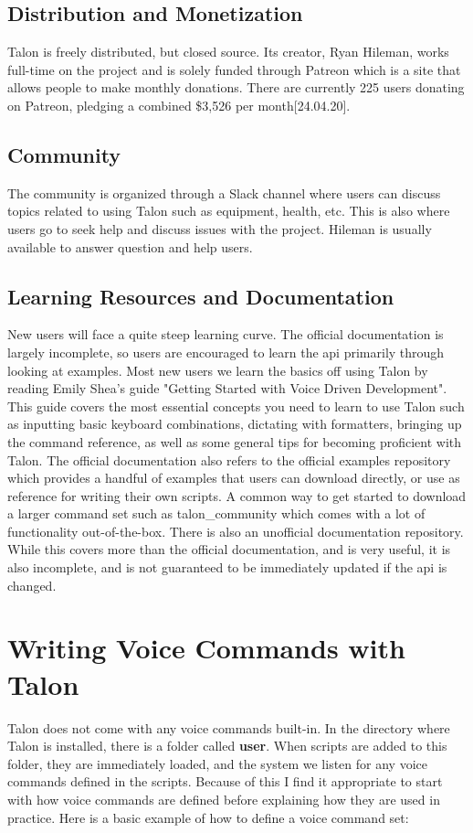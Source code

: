 \documentclass[a4paper,english]{ifimaster}
\begin{document}
\subsection{Distribution and Monetization}
Talon is freely distributed, but closed source.
Its creator, Ryan Hileman, works full-time on the project and is solely funded through Patreon which is a site that allows people to make monthly donations.
There are currently 225 users donating on Patreon, pledging a combined \$3,526 per month[24.04.20].

\subsection{Community}
The community is organized through a Slack channel where users can discuss topics related to using Talon such as equipment, health, etc.
This is also where users go to seek help and discuss issues with the project.
Hileman is usually available to answer question and help users.

\subsection{Learning Resources and Documentation}
New users will face a quite steep learning curve.
The official documentation is largely incomplete, so users are encouraged to learn the api primarily through looking at examples.
Most new users we learn the basics off using Talon by reading Emily Shea's guide "Getting Started with Voice Driven Development".
This guide covers the most essential concepts you need to learn to use Talon such as inputting basic keyboard combinations, dictating with formatters, bringing up the command reference, as well as some general tips for becoming proficient with Talon.
The official documentation also refers to the official examples repository which provides a handful of examples that users can download directly, or use as reference for writing their own scripts.
A common way to get started to download a larger command set such as talon\_community which comes with a lot of functionality out-of-the-box.
There is also an unofficial documentation repository.
While this covers more than the official documentation, and is very useful, it is also incomplete, and is not guaranteed to be immediately updated if the api is changed.

\section{Writing Voice Commands with Talon}
Talon does not come with any voice commands built-in.
In the directory where Talon is installed, there is a folder called \textbf{user}.
When scripts are added to this folder, they are immediately loaded, and the system we listen for any voice commands defined in the scripts.
Because of this I find it appropriate to start with how voice commands are defined before explaining how they are used in practice.
Here is a basic example of how to define a voice command set:
\end{document}
